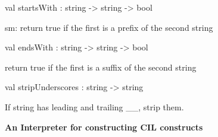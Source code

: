 \documentclass[11pt]{article}
\begin{document}
\label{val:Cil.startsWith}\begin{ocamldoccode}
val startsWith : string -> string -> bool
\end{ocamldoccode}
\begin{ocamldocdescription}
sm: return true if the first is a prefix of the second string


\end{ocamldocdescription}




\label{val:Cil.endsWith}\begin{ocamldoccode}
val endsWith : string -> string -> bool
\end{ocamldoccode}
\begin{ocamldocdescription}
return true if the first is a suffix of the second string


\end{ocamldocdescription}




\label{val:Cil.stripUnderscores}\begin{ocamldoccode}
val stripUnderscores : string -> string
\end{ocamldoccode}
\begin{ocamldocdescription}
If string has leading and trailing \_\_, strip them.


\end{ocamldocdescription}




{\bf An Interpreter for constructing CIL constructs}
\end{document}
